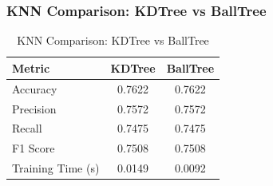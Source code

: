 \documentclass[12pt]{article}
\begin{document}
\subsubsection*{KNN Comparison: KDTree vs BallTree}
\begin{table}[H]
\centering
\caption{KNN Comparison: KDTree vs BallTree}
\label{tab:knn_tree_comparison}
\begin{tabular}{@{}lcc@{}}
\toprule
\textbf{Metric} & \textbf{KDTree} & \textbf{BallTree} \\
\midrule
Accuracy & 0.7622 & 0.7622 \\
Precision & 0.7572 & 0.7572 \\
Recall & 0.7475 & 0.7475 \\
F1 Score & 0.7508 & 0.7508 \\
Training Time (s) & 0.0149 & 0.0092 \\
\bottomrule
\end{tabular}
\end{table}
\end{document}
